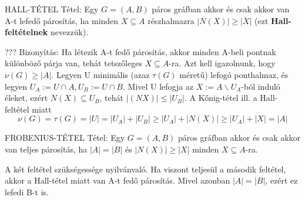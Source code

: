 \documentclass[]{article}
\begin{document}
\begin{framed}
HALL-TÉTEL Tétel: Egy $G = (A,B)$ páros gráfban akkor és csak akkor van A-t lefedő párosítás, ha minden $X \subseteq A$ részhalmazra $|N(X)| \geq |X|$ (ezt \textbf{Hall-feltételnek} nevezzük).
\end{framed}
\begin{leftbar}???
Bizonyítás: Ha létezik A-t fedő párosítás, akkor minden A-beli pontnak különböző párja van, tehát tetszőleges $X \subseteq A$-ra. Azt kell igazolnunk, hogy $\nu(G) \geq |A|$. Legyen U minimális (azaz $\tau(G)$ méretű) lefogó ponthalmaz, és legyen $U_A :=U\cap A,U_B:=U\cap B$. Mivel U lefogja az $X := A \backslash U_A$-ból induló éleket, ezért $N(X) \subseteq U_B$, tehát $|(NX)| \leq |U_B|$. A Kőnig-tétel ill. a Hall-feltétel miatt
$$\nu(G) = \tau(G) = |U| = |U_A| + |U_B| \geq |U_A| + |N(X)| \geq |U_A| + |X| = |A|$$
\end{leftbar}
\begin{framed}
FROBENIUS-TÉTEL Tétel: Egy $G = (A,B)$ páros gráfban akkor és csak akkor van teljes párosítás, ha $|A| = |B|$ és $|N(X)| \geq |X|$ minden $X \subseteq A$-ra.
\end{framed}
\begin{leftbar}
A két feltétel szükségessége nyilvánvaló. Ha viszont teljesül a második feltétel, akkor a Hall-tétel miatt van A-t fedő párosítás. Mivel azonban $|A| = |B|$, ezért ez lefedi B-t is.
\end{leftbar}
\end{document}

